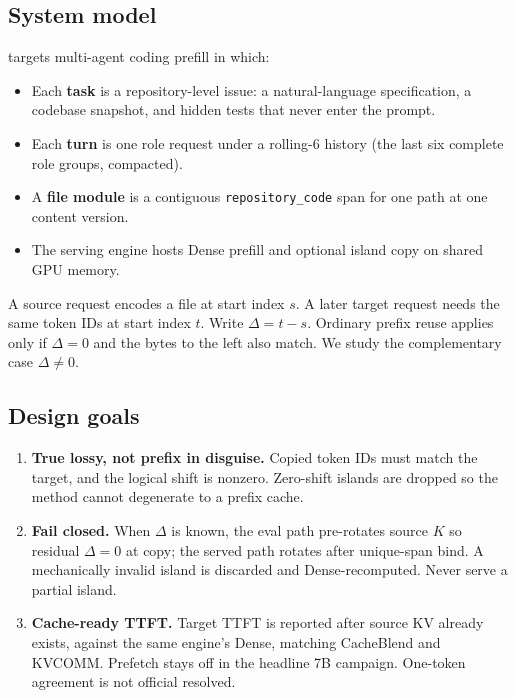 \subsection{System model}

\method{} targets multi-agent coding prefill in which:

\begin{itemize}[leftmargin=1.2em,itemsep=0.2em]
    \item Each \textbf{task} is a repository-level issue: a natural-language
          specification, a codebase snapshot, and hidden tests that never
          enter the prompt.
    \item Each \textbf{turn} is one role request under a rolling-6 history
          (the last six complete role groups, compacted).
    \item A \textbf{file module} is a contiguous \texttt{repository\_code}
          span for one path at one content version.
    \item The serving engine hosts Dense prefill and optional island copy
          on shared GPU memory.
\end{itemize}

A source request encodes a file at start index $s$. A later target request
needs the same token IDs at start index $t$. Write
$\Delta = t - s$. Ordinary prefix reuse applies only if $\Delta = 0$ and
the bytes to the left also match. We study the complementary case
$\Delta \neq 0$.

\subsection{Design goals}

\begin{enumerate}[leftmargin=1.2em,itemsep=0.25em]
    \item \textbf{True lossy, not prefix in disguise.} Copied token IDs
          must match the target, and the logical shift is
          nonzero. Zero-shift islands are dropped so the method cannot
          degenerate to a prefix cache.
    \item \textbf{Fail closed.} When $\Delta$ is known, the eval path
          pre-rotates source $K$ so residual $\Delta=0$ at copy; the
          served path rotates after unique-span bind. A mechanically
          invalid island is discarded and Dense-recomputed. Never serve
          a partial island.
    \item \textbf{Cache-ready TTFT.} Target TTFT is reported after source
          KV already exists, against the same engine's Dense, matching
          CacheBlend and KVCOMM. Prefetch stays off in the headline 7B
          campaign. One-token agreement is not official resolved.
\end{enumerate}


